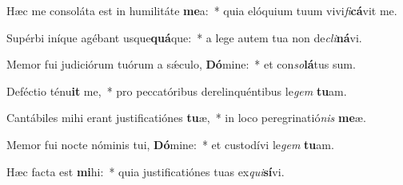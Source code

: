 \item Hæc me consoláta est in humilitáte \textbf{me}a:~* quia elóquium tuum vivi\textit{fi}\textbf{cá}vit me.
\item Supérbi iníque agébant usque\textbf{quá}que:~* a lege autem tua non de\textit{cli}\textbf{ná}vi.
\item Memor fui judiciórum tuórum a sǽculo, \textbf{Dó}mine:~* et con\textit{so}\textbf{lá}tus sum.
\item Deféctio ténu\textbf{it} me,~* pro peccatóribus derelinquéntibus le\textit{gem} \textbf{tu}am.
\item Cantábiles mihi erant justificatiónes \textbf{tu}æ,~* in loco peregrinatió\textit{nis} \textbf{me}æ.
\item Memor fui nocte nóminis tui, \textbf{Dó}mine:~* et custodívi le\textit{gem} \textbf{tu}am.
\item Hæc facta est \textbf{mi}hi:~* quia justificatiónes tuas ex\textit{qui}\textbf{sí}vi.
